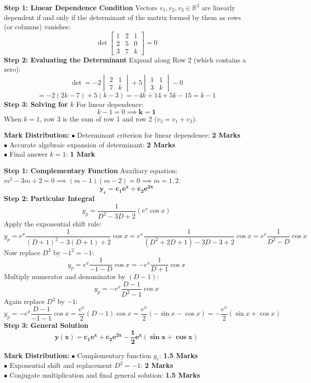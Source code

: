 \begin{solutionbox}
\textbf{Step 1: Linear Dependence Condition}
Vectors $v_1, v_2, v_3 \in \mathbb{R}^3$ are linearly dependent if and only if the determinant of the matrix formed by them as rows (or columns) vanishes:
\[
\det \begin{bmatrix} 1 & 2 & 1 \\ 2 & 5 & 0 \\ 3 & 7 & k \end{bmatrix} = 0
\]
\textbf{Step 2: Evaluating the Determinant}
Expand along Row 2 (which contains a zero):
\[
\det = -2\begin{vmatrix} 2 & 1 \\ 7 & k \end{vmatrix} + 5\begin{vmatrix} 1 & 1 \\ 3 & k \end{vmatrix} - 0
\]
\[
= -2(2k - 7) + 5(k - 3) = -4k + 14 + 5k - 15 = k - 1
\]
\textbf{Step 3: Solving for $k$}
For linear dependence:
\[
k - 1 = 0 \implies \mathbf{k = 1}
\]
When $k = 1$, row 3 is the sum of row 1 and row 2 ($v_3 = v_1 + v_2$).

\begin{markingrubric}
\textbf{Mark Distribution:}
$\bullet$ Determinant criterion for linear dependence: \textbf{2 Marks}\\
$\bullet$ Accurate algebraic expansion of determinant: \textbf{2 Marks}\\
$\bullet$ Final answer $k = 1$: \textbf{1 Mark}
\end{markingrubric}
\end{solutionbox}

\begin{solutionbox}
\textbf{Step 1: Complementary Function}
Auxiliary equation: $m^2 - 3m + 2 = 0 \implies (m - 1)(m - 2) = 0 \implies m = 1, 2$.
\[
\mathbf{y_c = c_1 e^x + c_2 e^{2x}}
\]
\textbf{Step 2: Particular Integral}
\[
y_p = \frac{1}{D^2 - 3D + 2} (e^x \cos x)
\]
Apply the exponential shift rule:
\[
y_p = e^x \frac{1}{(D+1)^2 - 3(D+1) + 2} \cos x = e^x \frac{1}{(D^2 + 2D + 1) - 3D - 3 + 2} \cos x = e^x \frac{1}{D^2 - D} \cos x
\]
Now replace $D^2$ by $-1^2 = -1$:
\[
y_p = e^x \frac{1}{-1 - D} \cos x = -e^x \frac{1}{D + 1} \cos x
\]
Multiply numerator and denominator by $(D - 1)$:
\[
y_p = -e^x \frac{D - 1}{D^2 - 1} \cos x
\]
Again replace $D^2$ by $-1$:
\[
y_p = -e^x \frac{D - 1}{-1 - 1} \cos x = \frac{e^x}{2} (D - 1)\cos x = \frac{e^x}{2}(-\sin x - \cos x) = -\frac{e^x}{2}(\sin x + \cos x)
\]
\textbf{Step 3: General Solution}
\[
\mathbf{y(x) = c_1 e^x + c_2 e^{2x} - \frac{1}{2} e^x (\sin x + \cos x)}
\]

\begin{markingrubric}
\textbf{Mark Distribution:}
$\bullet$ Complementary function $y_c$: \textbf{1.5 Marks}\\
$\bullet$ Exponential shift and replacement $D^2 = -1$: \textbf{2 Marks}\\
$\bullet$ Conjugate multiplication and final general solution: \textbf{1.5 Marks}
\end{markingrubric}
\end{solutionbox}

\newpage
